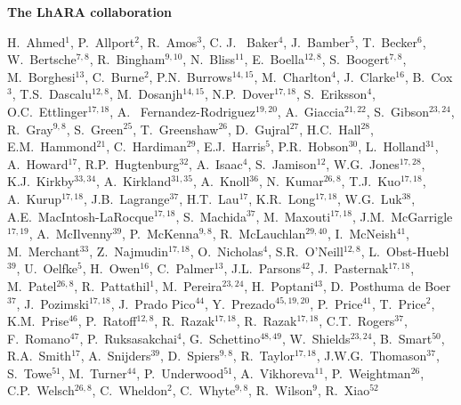 \vspace{0.75cm}
\begin{center}
  {\bf \color{BlueViolet} The LhARA collaboration} \\
  \vspace{0.25cm}
\end{center}
\begin{center}
  H.~Ahmed$^{1}$,
  P.~Allport$^{2}$,
  R.~Amos$^{3}$,
  C. J. ~Baker$^{4}$,
  J.~Bamber$^{5}$,
  T.~Becker$^{6}$,
  W.~Bertsche$^{7,8}$,
  R.~Bingham$^{9,10}$,
  N.~Bliss$^{11}$,
  E.~Boella$^{12,8}$,
  S.~Boogert$^{7,8}$,
  M.~Borghesi$^{13}$,
  C.~Burne$^{2}$,
  P.N.~Burrows$^{14,15}$,
  M.~Charlton$^{4}$,
  J.~Clarke$^{16}$,
  B.~Cox$^{3}$,
  T.S.~Dascalu$^{12,8}$,
  M.~Dosanjh$^{14,15}$,
  N.P.~Dover$^{17,18}$,
  S.~Eriksson$^{4}$,
  O.C.~Ettlinger$^{17,18}$,
  A. ~Fernandez-Rodriguez$^{19,20}$,
  A.~Giaccia$^{21,22}$,
  S.~Gibson$^{23,24}$,
  R.~Gray$^{9,8}$,
  S.~Green$^{25}$,
  T.~Greenshaw$^{26}$,
  D.~Gujral$^{27}$,
  H.C.~Hall$^{28}$,
  E.M.~Hammond$^{21}$,
  C.~Hardiman$^{29}$,
  E.J.~Harris$^{5}$,
  P.R.~Hobson$^{30}$,
  L.~Holland$^{31}$,
  A.~Howard$^{17}$,
  R.P.~Hugtenburg$^{32}$,
  A.~Isaac$^{4}$,
  S.~Jamison$^{12}$,
  W.G.~Jones$^{17,28}$,
  K.J.~Kirkby$^{33,34}$,
  A.~Kirkland$^{31,35}$,
  A.~Knoll$^{36}$,
  N.~Kumar$^{26,8}$,
  T.J.~Kuo$^{17,18}$,
  A.~Kurup$^{17,18}$,
  J.B.~Lagrange$^{37}$,
  H.T.~Lau$^{17}$,
  K.R.~Long$^{17,18}$,
  W.G.~Luk$^{38}$,
  A.E.~MacIntosh-LaRocque$^{17,18}$,
  S.~Machida$^{37}$,
  M.~Maxouti$^{17,18}$,
  J.M.~McGarrigle$^{17,19}$,
  A.~McIlvenny$^{39}$,
  P.~McKenna$^{9,8}$,
  R.~McLauchlan$^{29,40}$,
  I.~McNeish$^{41}$,
  M.~Merchant$^{33}$,
  Z.~Najmudin$^{17,18}$,
  O.~Nicholas$^{4}$,
  S.R.~O'Neill$^{12,8}$,
  L.~Obst-Huebl$^{39}$,
  U.~Oelfke$^{5}$,
  H.~Owen$^{16}$,
  C.~Palmer$^{13}$,
  J.L.~Parsons$^{42}$,
  J.~Pasternak$^{17,18}$,
  M.~Patel$^{26,8}$,
  R.~Pattathil$^{1}$,
  M.~Pereira$^{23,24}$,
  H.~Poptani$^{43}$,
  D.~Posthuma de Boer$^{37}$,
  J.~Pozimski$^{17,18}$,
  J.~Prado Pico$^{44}$,
  Y.~Prezado$^{45,19,20}$,
  P.~Price$^{41}$,
  T.~Price$^{2}$,
  K.M.~Prise$^{46}$,
  P.~Ratoff$^{12,8}$,
  R.~Razak$^{17,18}$,
  R.~Razak$^{17,18}$,
  C.T.~Rogers$^{37}$,
  F.~Romano$^{47}$,
  P.~Ruksasakchai$^{4}$,
  G.~Schettino$^{48,49}$,
  W.~Shields$^{23,24}$,
  B.~Smart$^{50}$,
  R.A.~Smith$^{17}$,
  A.~Snijders$^{39}$,
  D.~Spiers$^{9,8}$,
  R.~Taylor$^{17,18}$,
  J.W.G.~Thomason$^{37}$,
  S.~Towe$^{51}$,
  M.~Turner$^{44}$,
  P.~Underwood$^{51}$,
  A.~Vikhoreva$^{11}$,
  P.~Weightman$^{26}$,
  C.P.~Welsch$^{26,8}$,
  C.~Wheldon$^{2}$,
  C.~Whyte$^{9,8}$,
  R.~Wilson$^{9}$,
  R.~Xiao$^{52}$
\end{center}
